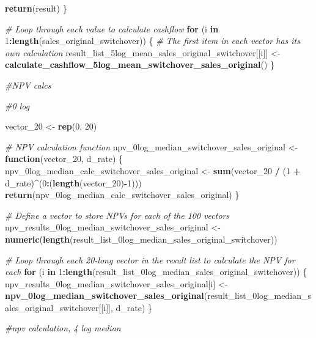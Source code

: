 \documentclass[
]{article}
\newenvironment{Shaded}{\begin{snugshade}}{\end{snugshade}}
\newcommand{\CommentTok}[1]{\textcolor[rgb]{0.56,0.35,0.01}{\textit{#1}}}
\newcommand{\ControlFlowTok}[1]{\textcolor[rgb]{0.13,0.29,0.53}{\textbf{#1}}}
\newcommand{\DecValTok}[1]{\textcolor[rgb]{0.00,0.00,0.81}{#1}}
\newcommand{\FunctionTok}[1]{\textcolor[rgb]{0.13,0.29,0.53}{\textbf{#1}}}
\newcommand{\NormalTok}[1]{#1}
\newcommand{\OtherTok}[1]{\textcolor[rgb]{0.56,0.35,0.01}{#1}}
\newcommand{\SpecialCharTok}[1]{\textcolor[rgb]{0.81,0.36,0.00}{\textbf{#1}}}
\begin{document}
\begin{Shaded}
\begin{Highlighting}[]
  \FunctionTok{return}\NormalTok{(result)}
\NormalTok{\}}

\CommentTok{\# Loop through each value to calculate cashflow}
\ControlFlowTok{for}\NormalTok{ (i }\ControlFlowTok{in} \DecValTok{1}\SpecialCharTok{:}\FunctionTok{length}\NormalTok{(sales\_original\_switchover)) \{}
  \CommentTok{\# The first item in each vector has its own calculation}
\NormalTok{  result\_list\_5log\_mean\_sales\_original\_switchover[[i]] }\OtherTok{\textless{}{-}} \FunctionTok{calculate\_cashflow\_5log\_mean\_switchover\_sales\_original}\NormalTok{()}
\NormalTok{\}}


\CommentTok{\#NPV calcs}

\CommentTok{\#0 log }

\NormalTok{vector\_20 }\OtherTok{\textless{}{-}} \FunctionTok{rep}\NormalTok{(}\DecValTok{0}\NormalTok{, }\DecValTok{20}\NormalTok{)}

\CommentTok{\# NPV calculation function}
\NormalTok{npv\_0log\_median\_switchover\_sales\_original }\OtherTok{\textless{}{-}} \ControlFlowTok{function}\NormalTok{(vector\_20, d\_rate) \{}
\NormalTok{  npv\_0log\_median\_calc\_switchover\_sales\_original }\OtherTok{\textless{}{-}} \FunctionTok{sum}\NormalTok{(vector\_20 }\SpecialCharTok{/}\NormalTok{ (}\DecValTok{1} \SpecialCharTok{+}\NormalTok{ d\_rate)}\SpecialCharTok{\^{}}\NormalTok{(}\DecValTok{0}\SpecialCharTok{:}\NormalTok{(}\FunctionTok{length}\NormalTok{(vector\_20)}\SpecialCharTok{{-}}\DecValTok{1}\NormalTok{)))}
  \FunctionTok{return}\NormalTok{(npv\_0log\_median\_calc\_switchover\_sales\_original)}
\NormalTok{\}}

\CommentTok{\# Define a vector to store NPVs for each of the 100 vectors}
\NormalTok{npv\_results\_0log\_median\_switchover\_sales\_original }\OtherTok{\textless{}{-}} \FunctionTok{numeric}\NormalTok{(}\FunctionTok{length}\NormalTok{(result\_list\_0log\_median\_sales\_original\_switchover))}

\CommentTok{\# Loop through each 20{-}long vector in the result list to calculate the NPV for each}
\ControlFlowTok{for}\NormalTok{ (i }\ControlFlowTok{in} \DecValTok{1}\SpecialCharTok{:}\FunctionTok{length}\NormalTok{(result\_list\_0log\_median\_sales\_original\_switchover)) \{}
\NormalTok{  npv\_results\_0log\_median\_switchover\_sales\_original[i] }\OtherTok{\textless{}{-}} \FunctionTok{npv\_0log\_median\_switchover\_sales\_original}\NormalTok{(result\_list\_0log\_median\_sales\_original\_switchover[[i]], d\_rate)}
\NormalTok{\}}


\CommentTok{\#npv calculation, 4 log median}



\end{Highlighting}
\end{Shaded}
\end{document}
